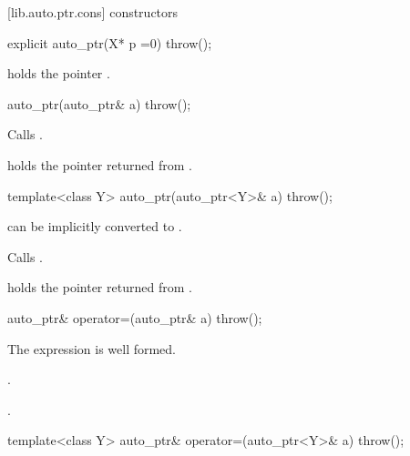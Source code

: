 [lib.auto.ptr.cons]{ constructors}

%
\begin{itemdecl}
explicit auto_ptr(X* p =0) throw();
\end{itemdecl}

\begin{itemdescr}
\pnum
\postconditions
{} holds the pointer .
\end{itemdescr}

%
\begin{itemdecl}
auto_ptr(auto_ptr& a) throw();
\end{itemdecl}

\begin{itemdescr}
\pnum
\effects
Calls .

\pnum
\postconditions
{} holds the pointer returned from .
\end{itemdescr}

%
\begin{itemdecl}
template<class Y> auto_ptr(auto_ptr<Y>& a) throw();
\end{itemdecl}

\begin{itemdescr}
\pnum
\requires
{} can be implicitly converted to .

\pnum
\effects
Calls .

\pnum
\postconditions
{} holds the pointer returned from .
\end{itemdescr}

%
\begin{itemdecl}
auto_ptr& operator=(auto_ptr& a) throw();
\end{itemdecl}

\begin{itemdescr}
\pnum
\requires
The expression  is well formed.

\pnum
\effects
{}.

\pnum
\returns
{}.
\end{itemdescr}

%
%
\begin{itemdecl}
template<class Y> auto_ptr& operator=(auto_ptr<Y>& a) throw();
\end{itemdecl}


